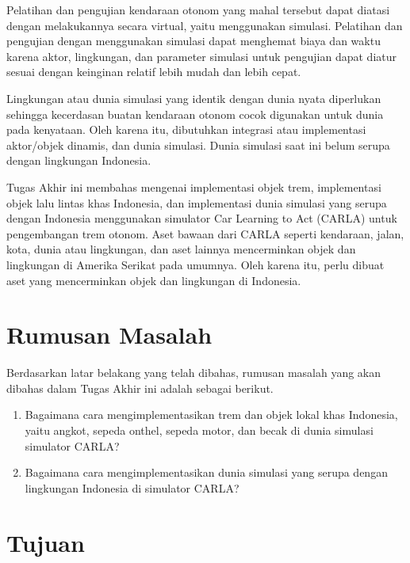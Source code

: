 Pelatihan dan pengujian kendaraan otonom yang mahal tersebut dapat diatasi
dengan melakukannya secara virtual, yaitu menggunakan simulasi. Pelatihan dan
pengujian dengan menggunakan simulasi dapat menghemat biaya dan waktu karena
aktor, lingkungan, dan parameter simulasi untuk pengujian dapat diatur sesuai
dengan keinginan relatif lebih mudah dan lebih cepat.

Lingkungan atau dunia simulasi yang identik dengan dunia nyata diperlukan
sehingga kecerdasan buatan kendaraan otonom cocok digunakan untuk dunia pada
kenyataan. Oleh karena itu, dibutuhkan integrasi atau implementasi aktor/objek
dinamis, dan dunia simulasi. Dunia simulasi saat ini belum serupa dengan
lingkungan Indonesia.

Tugas Akhir ini membahas mengenai implementasi objek trem, implementasi objek
lalu lintas khas Indonesia, dan implementasi dunia simulasi yang serupa dengan
Indonesia menggunakan simulator Car Learning to Act (CARLA) untuk pengembangan
trem otonom. Aset bawaan dari CARLA seperti kendaraan, jalan, kota, dunia atau
lingkungan, dan aset lainnya mencerminkan objek dan lingkungan di Amerika
Serikat pada umumnya. Oleh karena itu, perlu dibuat aset yang mencerminkan objek
dan lingkungan di Indonesia.


\section{Rumusan Masalah}

Berdasarkan latar belakang yang telah dibahas, rumusan masalah yang akan dibahas
dalam Tugas Akhir ini adalah sebagai berikut.

\begin{enumerate}

    \item Bagaimana cara mengimplementasikan trem dan objek lokal khas
    Indonesia, yaitu angkot, sepeda onthel, sepeda motor, dan becak
    di dunia simulasi simulator CARLA?

    \item Bagaimana cara mengimplementasikan dunia simulasi yang serupa
    dengan lingkungan Indonesia di simulator CARLA?

\end{enumerate}

\section{Tujuan}

